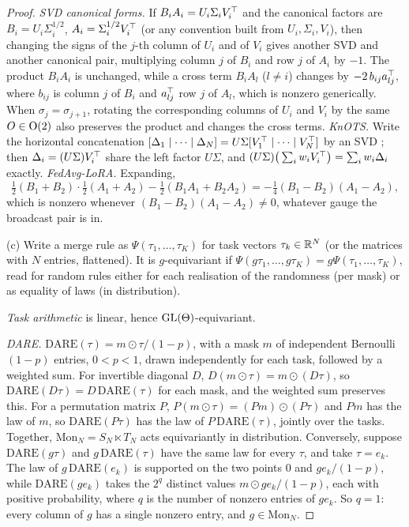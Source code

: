 \begin{proof}
\emph{SVD canonical forms.} If $B_iA_i=U_i\Sigma_iV_i^{\top}$ and the canonical factors are $B_i=U_i\Sigma_i^{1/2}$,
$A_i=\Sigma_i^{1/2}V_i^{\top}$ (or any convention built from $U_i,\Sigma_i,V_i$), then changing the signs of the $j$-th column of
$U_i$ and of $V_i$ gives another SVD and another canonical pair, multiplying column $j$ of $B_i$ and row $j$ of $A_i$ by $-1$.
The product $B_iA_i$ is unchanged, while a cross term $B_iA_l$ ($l\ne i$) changes by $-2\,b_{ij}a_{lj}^{\top}$, where $b_{ij}$ is
column $j$ of $B_i$ and $a_{lj}^{\top}$ row $j$ of $A_l$, which is nonzero generically. When $\sigma_j=\sigma_{j+1}$, rotating the
corresponding columns of $U_i$ and $V_i$ by the same $O\in\mathrm{O}(2)$ also preserves the product and changes the cross terms.
\emph{KnOTS.} Write the horizontal concatenation $[\Delta_1\mid\cdots\mid\Delta_N]=U\Sigma[V_1^{\top}\mid\cdots\mid V_N^{\top}]$ by an
SVD \citep{stoica2024model}; then $\Delta_i=(U\Sigma)V_i^{\top}$ share the left factor $U\Sigma$, and
$(U\Sigma)\big(\sum_iw_iV_i^{\top}\big)=\sum_iw_i\Delta_i$ exactly. \emph{FedAvg-LoRA.} Expanding,
\[\tfrac12(B_1+B_2)\cdot\tfrac12(A_1+A_2)-\tfrac12(B_1A_1+B_2A_2)=-\tfrac14(B_1-B_2)(A_1-A_2),\]
which is nonzero whenever $(B_1-B_2)(A_1-A_2)\ne0$, whatever gauge the broadcast pair is in.

(c) Write a merge rule as $\Psi(\tau_1,\dots,\tau_K)$ for task vectors $\tau_k\in\mathbb{R}^N$ (or the matrices with $N$ entries,
flattened). It is $g$-equivariant if $\Psi(g\tau_1,\dots,g\tau_K)=g\Psi(\tau_1,\dots,\tau_K)$, read for random rules either
for each realisation of the randomness (per mask) or as equality of laws (in distribution).

\emph{Task arithmetic} is linear, hence $\mathrm{GL}(\Theta)$-equivariant.

\emph{DARE.} $\mathrm{DARE}(\tau)=m\odot\tau/(1-p)$, with a mask $m$ of independent Bernoulli$(1-p)$ entries, $0<p<1$,
drawn independently for each task, followed by a weighted sum. For invertible diagonal $D$, $D(m\odot\tau)=m\odot(D\tau)$, so
$\mathrm{DARE}(D\tau)=D\,\mathrm{DARE}(\tau)$ for each mask, and the weighted sum preserves this. For a permutation matrix $P$,
$P(m\odot\tau)=(Pm)\odot(P\tau)$ and $Pm$ has the law of $m$, so $\mathrm{DARE}(P\tau)$ has the law of $P\,\mathrm{DARE}(\tau)$,
jointly over the tasks. Together, $\mathrm{Mon}_N=S_N\ltimes T_N$ acts equivariantly in distribution. Conversely, suppose
$\mathrm{DARE}(g\tau)$ and $g\,\mathrm{DARE}(\tau)$ have the same law for every $\tau$, and take $\tau=e_k$. The law of
$g\,\mathrm{DARE}(e_k)$ is supported on the two points $0$ and $ge_k/(1-p)$, while $\mathrm{DARE}(ge_k)$ takes the $2^q$
distinct values $m\odot ge_k/(1-p)$, each with positive probability, where $q$ is the number of nonzero entries of $ge_k$. So
$q=1$: every column of $g$ has a single nonzero entry, and $g\in\mathrm{Mon}_N$.


\end{proof}
